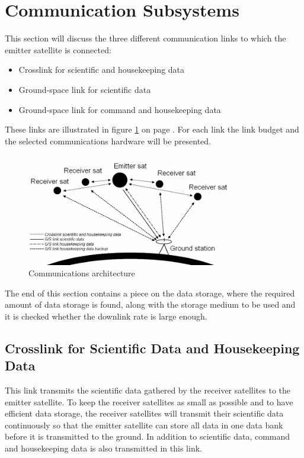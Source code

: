 
\section{Communication Subsystems}
\label{sec:comm_emitter}
This section will discuss the  three different communication links to which the emitter satellite is connected:
\begin{itemize}
\item Crosslink for scientific and housekeeping data
\item Ground-space link for scientific data
\item Ground-space link for command and housekeeping data
\end{itemize}

These links are illustrated in figure \ref{fig:allesZW} on page \pageref{fig:allesZW}. For each link the link budget and the selected communications hardware will be presented.

\begin{figure}[ht!]
\centering    \includegraphics[width=0.8\textwidth]{chapters/img/allesZW.png}
\caption{Communications architecture}
\label{fig:allesZW}
\end{figure}

The end of this section contains a piece on the data storage, where the required amount of data storage is found, along with the storage medium to be used and it is checked whether the downlink rate is large enough.


\subsection{Crosslink for Scientific Data and Housekeeping Data}
\label{Crossem}
This link transmits the scientific data gathered by the receiver satellites to the emitter satellite. To keep the receiver satellites as small as possible and to have efficient data storage, the receiver satellites will transmit their scientific data continuously so that the emitter satellite can store all data in one data bank before it is transmitted to the ground. In addition to scientific data, command and housekeeping data is also transmitted in this link.

